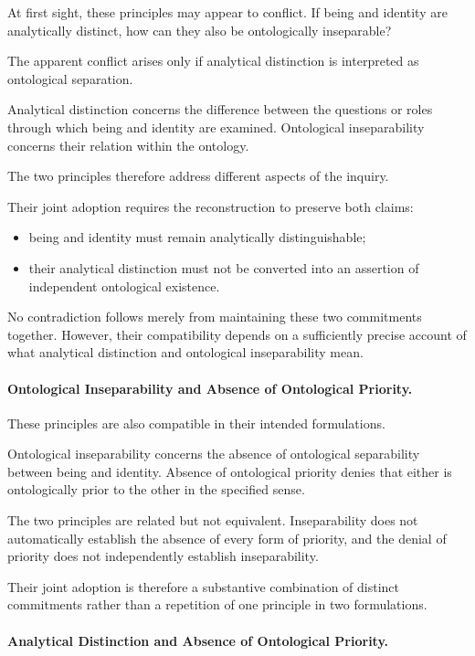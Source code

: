 At first sight, these principles may appear to conflict.
If being and identity are analytically distinct, how can
they also be ontologically inseparable?

The apparent conflict arises only if analytical distinction
is interpreted as ontological separation.

Analytical distinction concerns the difference between
the questions or roles through which being and identity
are examined. Ontological inseparability concerns their
relation within the ontology.

The two principles therefore address different aspects
of the inquiry.

Their joint adoption requires the reconstruction to preserve
both claims:

\begin{itemize}
    \item being and identity must remain analytically
    distinguishable;
    \item their analytical distinction must not be converted
    into an assertion of independent ontological existence.
\end{itemize}

No contradiction follows merely from maintaining these
two commitments together. However, their compatibility
depends on a sufficiently precise account of what analytical
distinction and ontological inseparability mean.

\paragraph{Ontological Inseparability and Absence of Ontological
Priority.}

These principles are also compatible in their intended
formulations.

Ontological inseparability concerns the absence of ontological
separability between being and identity. Absence of ontological
priority denies that either is ontologically prior to the
other in the specified sense.

The two principles are related but not equivalent. Inseparability
does not automatically establish the absence of every form
of priority, and the denial of priority does not independently
establish inseparability.

Their joint adoption is therefore a substantive combination
of distinct commitments rather than a repetition of one
principle in two formulations.

\paragraph{Analytical Distinction and Absence of Ontological
Priority.}


